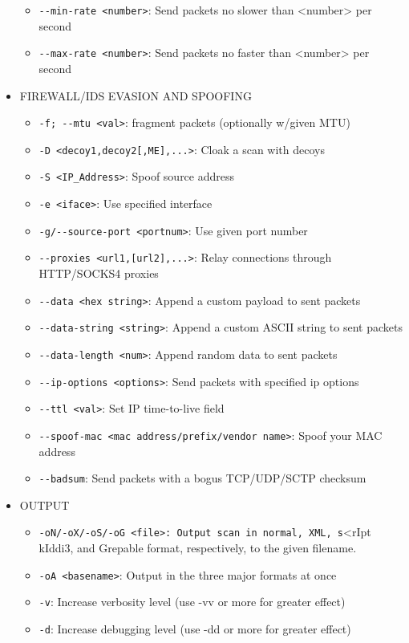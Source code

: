 \begin{itemize}
\begin{itemize}
        \item \verb|--min-rate <number>|: Send packets no slower than <number> per second
        \item \verb|--max-rate <number>|: Send packets no faster than <number> per second
    \end{itemize}
    \item FIREWALL/IDS EVASION AND SPOOFING
    \begin{itemize}
        \item \verb|-f; --mtu <val>|: fragment packets (optionally w/given MTU)
        \item \verb|-D <decoy1,decoy2[,ME],...>|: Cloak a scan with decoys
        \item \verb|-S <IP_Address>|: Spoof source address
        \item \verb|-e <iface>|: Use specified interface
        \item \verb|-g/--source-port <portnum>|: Use given port number
        \item \verb|--proxies <url1,[url2],...>|: Relay connections through HTTP/SOCKS4 proxies
        \item \verb|--data <hex string>|: Append a custom payload to sent packets
        \item \verb|--data-string <string>|: Append a custom ASCII string to sent packets
        \item \verb|--data-length <num>|: Append random data to sent packets
        \item \verb|--ip-options <options>|: Send packets with specified ip options
        \item \verb|--ttl <val>|: Set IP time-to-live field
        \item \verb|--spoof-mac <mac address/prefix/vendor name>|: Spoof your MAC address
        \item \verb|--badsum|: Send packets with a bogus TCP/UDP/SCTP checksum
    \end{itemize}
    \item OUTPUT
    \begin{itemize}
        \item \verb|-oN/-oX/-oS/-oG <file>: Output scan in normal, XML, s|<rIpt kIddi3,
        and Grepable format, respectively, to the given filename.
     \item \verb|-oA <basename>|: Output in the three major formats at once
     \item \verb|-v|: Increase verbosity level (use -vv or more for greater effect)
     \item \verb|-d|: Increase debugging level (use -dd or more for greater effect)

\end{itemize}
\end{itemize}
